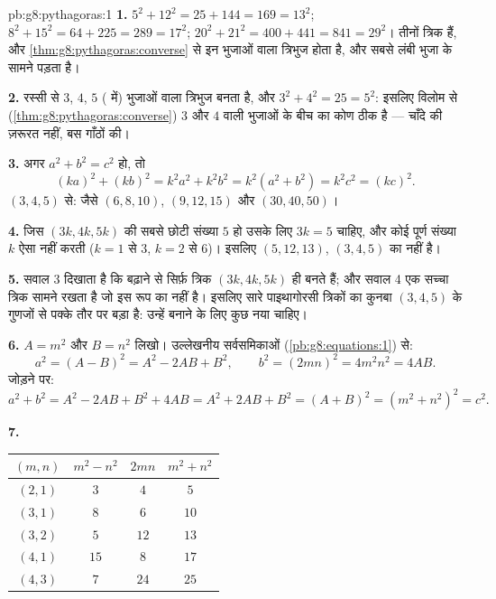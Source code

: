 \begin{solution}{pb:g8:pythagoras:1}
\textbf{1.} $5^2 + 12^2 = 25 + 144 = 169 = 13^2$; \quad
$8^2 + 15^2 = 64 + 225 = 289 = 17^2$; \quad
$20^2 + 21^2 = 400 + 441 = 841 = 29^2$। तीनों त्रिक हैं, और
\cref{thm:g8:pythagoras:converse} से इन भुजाओं वाला त्रिभुज 
होता है, और  सबसे लंबी भुजा के सामने पड़ता है।

\textbf{2.} रस्सी से $3$, $4$, $5$ ( में) भुजाओं वाला
त्रिभुज बनता है, और $3^2 + 4^2 = 25 = 5^2$: इसलिए विलोम से
(\cref{thm:g8:pythagoras:converse}) $3$ और $4$  वाली
भुजाओं के बीच का कोण ठीक  है --- चाँदे की ज़रूरत नहीं, बस
गाँठों की।

\textbf{3.} अगर $a^2 + b^2 = c^2$ हो, तो
\[
(ka)^2 + (kb)^2 = k^2 a^2 + k^2 b^2
= k^2\left(a^2 + b^2\right) = k^2 c^2 = (kc)^2 .
\]
$(3, 4, 5)$ से: जैसे $(6, 8, 10)$, $(9, 12, 15)$ और
$(30, 40, 50)$।

\textbf{4.} जिस  $(3k, 4k, 5k)$ की सबसे छोटी संख्या $5$ हो
उसके लिए $3k = 5$ चाहिए, और कोई पूर्ण संख्या $k$ ऐसा नहीं करती
($k = 1$ से $3$, $k = 2$ से $6$)। इसलिए $(5, 12, 13)$,
$(3, 4, 5)$ का  नहीं है।

\textbf{5.} सवाल 3 दिखाता है कि बढ़ाने से सिर्फ़ त्रिक
$(3k, 4k, 5k)$ ही बनते हैं; और सवाल 4 एक सच्चा त्रिक सामने रखता है
जो इस रूप का नहीं है। इसलिए सारे पाइथागोरसी त्रिकों का कुनबा
$(3, 4, 5)$ के गुणजों से पक्के तौर पर बड़ा है: उन्हें बनाने के लिए
कुछ नया चाहिए।

\textbf{6.} $A = m^2$ और $B = n^2$ लिखो। उल्लेखनीय सर्वसमिकाओं
(\cref{pb:g8:equations:1}) से:
\[
a^2 = (A - B)^2 = A^2 - 2AB + B^2,
\qquad
b^2 = (2mn)^2 = 4m^2n^2 = 4AB .
\]
जोड़ने पर:
\[
a^2 + b^2 = A^2 - 2AB + B^2 + 4AB
= A^2 + 2AB + B^2 = (A + B)^2
= \left(m^2 + n^2\right)^2 = c^2 .
\]

\textbf{7.}
\begin{center}
\renewcommand{\arraystretch}{1.2}
\begin{tabular}{c|ccc}
$(m, n)$ & $m^2 - n^2$ & $2mn$ & $m^2 + n^2$ \\
\hline
$(2, 1)$ & $3$ & $4$ & $5$ \\
$(3, 1)$ & $8$ & $6$ & $10$ \\
$(3, 2)$ & $5$ & $12$ & $13$ \\
$(4, 1)$ & $15$ & $8$ & $17$ \\
$(4, 3)$ & $7$ & $24$ & $25$ \\
\end{tabular}
\end{center}


\end{solution}

